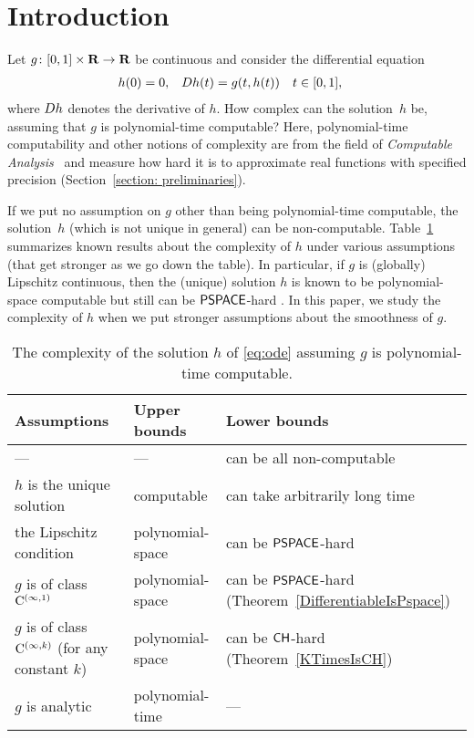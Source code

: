 \section{Introduction}

Let $g \colon [0,1] \times \mathbf R \to \mathbf R$ be continuous 
and consider the differential equation 
\begin{align}
 \label{eq:ode}
 h(0) & = 0, &
 D h(t) & = g(t,h(t)) \quad t \in [0,1], 
\end{align}
where $D h$ denotes the derivative of $h$. 
How complex can the solution~$h$ be, 
assuming that $g$ is polynomial-time computable? 
Here, polynomial-time computability 
and other notions of complexity 
are from the field of 
\emph{Computable Analysis}~\cite{weihrauch00:_comput_analy}
and measure how hard it is to 
approximate real functions with specified precision 
(Section~\ref{section: preliminaries}). 

If we put no assumption on $g$ other than being polynomial-time computable, 
the solution~$h$ (which is not unique in general) can be non-computable. 
Table~\ref{table:related} summarizes known results about 
the complexity of $h$ under various assumptions 
(that get stronger as we go down the table). 
In particular, if $g$ is (globally) Lipschitz continuous, 
then the (unique) solution $h$ is known to be 
polynomial-space computable but still can be 
$\mathsf{PSPACE}$-hard \cite{kawamura2010lipschitz}. 
In this paper, we study the complexity of $h$ 
when we put stronger assumptions about 
the smoothness of $g$. 

\begin{table}
\renewcommand\arraystretch{1.3}
\begin{center}
 \caption{The complexity of the solution $h$ of \eqref{eq:ode}
 assuming $g$ is polynomial-time computable.}
 \label{table:related}
 \begin{tabular}{lll}
  Assumptions & Upper bounds & Lower bounds \\
  \hline
   --- & --- & can be all non-computable \cite{pour1979computable} \\
  $h$ is the unique solution & computable \cite{coddington1955theory}
  & can take arbitrarily long time \cite{ko1983computational,miller1970recursive} \\
  the Lipschitz condition  & polynomial-space \cite{ko1983computational}
      &	can be $\mathsf{PSPACE}$-hard \cite{kawamura2010lipschitz}\\
  $g$ is of class $\mathrm C ^{(\infty, 1)}$ & polynomial-space 
      & \parbox[t]{11em}{can be $\mathsf{PSPACE}$-hard\\{}(Theorem~\ref{DifferentiableIsPspace})} \\
  \parbox[t]{11em}{$g$ is of class $\mathrm C ^{(\infty, k)}$\\{}(for any constant $k$)}
  & polynomial-space & \parbox[t]{11em}{can be $\mathsf{CH}$-hard\\{}(Theorem~\ref{KTimesIsCH})} \\
  $g$ is analytic
  & polynomial-time \cite{muller1987uniform,ko1988computing} 
  & ---
 \end{tabular}
\end{center}
\end{table}

